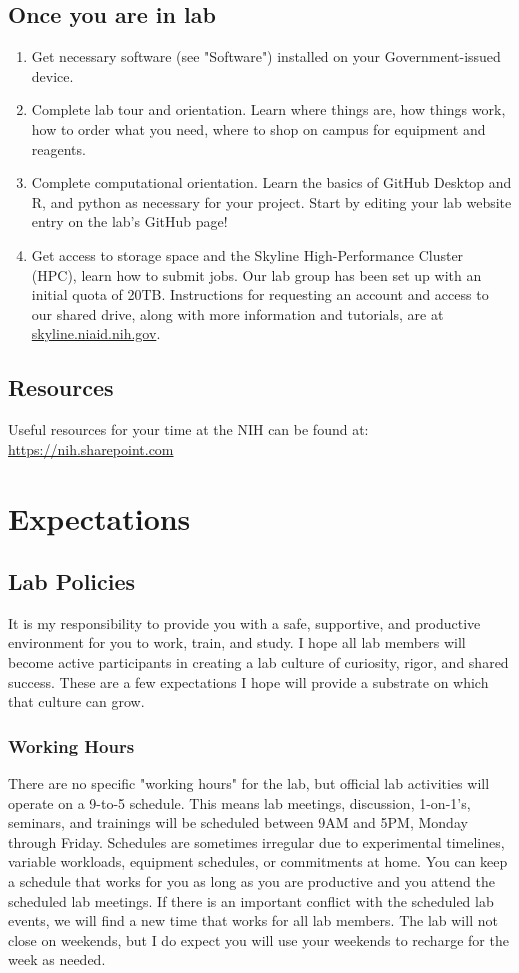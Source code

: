 \documentclass[10pt, letterpaper, twocolumn]{article} %
\begin{document}
\subsection{Once you are in lab}
\begin{enumerate}
\item Get necessary software (see "Software") installed on your Government-issued device.
\item Complete lab tour and orientation. Learn where things are, how things work, how to order what you need, where to shop on campus for equipment and reagents.
\item Complete computational orientation. Learn the basics of GitHub Desktop and R, and python as necessary for your project. Start by editing your lab website entry on the lab's GitHub page!
\item Get access to storage space and the Skyline High-Performance Cluster (HPC), learn how to submit jobs. Our lab group has been set up with an initial quota of 20TB. Instructions for requesting an account and access to our shared drive, along with more information and tutorials, are at \href{https://skyline.niaid.nih.gov}{skyline.niaid.nih.gov}.
\end{enumerate}

\subsection{Resources}
Useful resources for your time at the NIH can be found at: \href{https://nih.sharepoint.com}{https://nih.sharepoint.com}

\section{Expectations}
\subsection{Lab Policies}
It is my responsibility to provide you with a safe, supportive, and productive environment for you to work, train, and study. I hope all lab members will become active participants in creating a lab culture of curiosity, rigor, and shared success. These are a few expectations I hope will provide a substrate on which that culture can grow.

\subsubsection{Working Hours}
There are no specific "working hours" for the lab, but official lab activities will operate on a 9-to-5 schedule. This means lab meetings, discussion, 1-on-1's, seminars, and trainings will be scheduled between 9AM and 5PM, Monday through Friday. Schedules are sometimes irregular due to experimental timelines, variable workloads, equipment schedules, or commitments at home. You can keep a schedule that works for you as long as you are productive and you attend the scheduled lab meetings. If there is an important conflict with the scheduled lab events, we will find a new time that works for all lab members. The lab will not close on weekends, but I do expect you will use your weekends to recharge for the week as needed.
\end{document}
